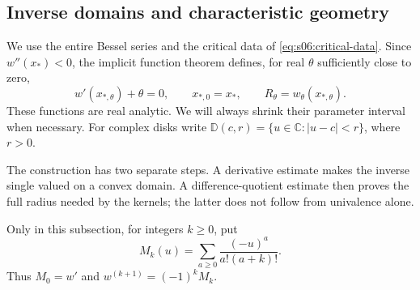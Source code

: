 \subsection{Inverse domains and characteristic geometry}
\label{subsec:b:domains}

We use the entire Bessel series and the critical data of
\eqref{eq:s06:critical-data}. Since $w''(x_*)<0$, the implicit
function theorem defines, for real $\theta$ sufficiently close to zero,
\begin{equation}\label{eq:b:critical-data}
 w'(x_{*,\theta})+\theta=0,\qquad
 x_{*,0}=x_*,\qquad R_\theta=w_\theta(x_{*,\theta}).
\end{equation}
These functions are real analytic. We will always shrink their
parameter interval when necessary. For complex disks write
$\mathbb D(c,r)=\{u\in\mathbb C:|u-c|<r\}$, where $r>0$.

The construction has two separate steps. A derivative estimate makes
the inverse single valued on a convex domain. A difference-quotient
estimate then proves the full radius needed by the kernels; the latter
does not follow from univalence alone.

Only in this subsection, for integers $k\geq0$, put
\[
 M_k(u)=\sum_{a\geq0}\frac{(-u)^a}{a!(a+k)!}.
\]
Thus $M_0=w'$ and $w^{(k+1)}=(-1)^kM_k$.


